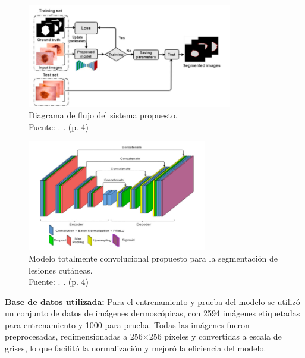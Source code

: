\begin{figure}[H]
	\begin{center}
		\includegraphics[width=0.80\textwidth]{2/figures/flowchart.png}
		\caption[Diagrama de flujo del sistema propuesto]{Diagrama de flujo del sistema propuesto.\\
			Fuente: \cite{karshiev2020improved}. . (p. 4)}
		\label{2:fig6}
	\end{center}
\end{figure}


\begin{figure}[H]
	\begin{center}
		\includegraphics[width=0.7\textwidth]{2/figures/segmentation1.png}
		\caption[Modelo totalmente convolucional propuesto para la segmentación de lesiones cutáneas]{Modelo totalmente convolucional propuesto para la segmentación de lesiones cutáneas.\\
			Fuente: \cite{karshiev2020improved}. . (p. 4)}
		\label{2:fig7}
	\end{center}
\end{figure}

\textbf{Base de datos utilizada:}
Para el entrenamiento y prueba del modelo se utilizó un conjunto de datos de imágenes dermoscópicas, con 2594 imágenes etiquetadas para entrenamiento y 1000 para prueba. Todas las imágenes fueron preprocesadas, redimensionadas a 256×256 píxeles y convertidas a escala de grises, lo que facilitó la normalización y mejoró la eficiencia del modelo.

